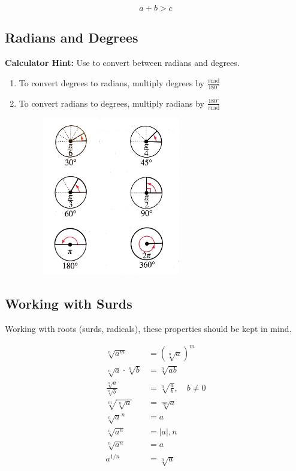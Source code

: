 \[
	a + b > c
\]

\subsection{Radians and Degrees}
\begin{mdframed}
\textbf{Calculator Hint:} Use   to convert between radians and degrees.
\end{mdframed}

\begin{enumerate}
	\item To convert degrees to radians, multiply degrees by \(\frac{\pi \mathrm{rad}}{180^{\circ}}\)
	\item To convert radians to degrees, multiply radians by \(\frac{180^{\circ}}{\pi \mathrm{rad}}\)
	      \begin{figure}[H]
	      	\centering
	      	\includegraphics[width=6cm]{rads}
	      \end{figure}
\end{enumerate}

\subsection{Working with Surds}
Working with roots (surds, radicals), these properties should be kept in mind.

\begin{align*}
	\sqrt[n]{a^{m}}                 & ={(\sqrt[n]{a})}^{m}                   \\
	\sqrt[n]{a} \cdot \sqrt[n]{b}   & =\sqrt[n]{a b}                         \\
	\frac{\sqrt[n]{a}}{\sqrt[n]{b}} & =\sqrt[n]{\frac{a}{b}}, \quad b \neq 0 \\
	\sqrt[m]{\sqrt[n]{a}}           & =\sqrt[m n]{a}                         \\
	\sqrt[n]{a}^{n}                 & =a                                     \\
	\sqrt[n]{a^{n}}                 & =|a|, n                                \\
	\sqrt[n]{a^{n}}                 & =a                                     \\
	a^{1 / n}                       & =\sqrt[n]{a}
\end{align*}


